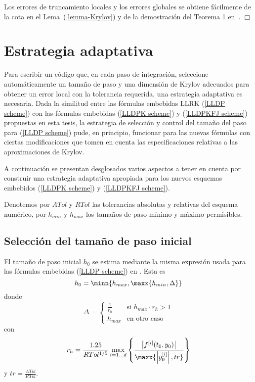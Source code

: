 Los errores de truncamiento locales y los errores globales se obtiene fácilmente de la
cota en el Lema~(\ref{lemma-Krylov}) y de la demostración del Teorema 1 en~\cite{Jimenez14AMC}. $\Box$

\section{Estrategia adaptativa\label{ADAPT-STR}}

Para escribir un c\'odigo que, en cada paso de integración, seleccione automáticamente un tama\~no de paso y una dimensi\'on de Krylov adecuados para obtener un error local con la tolerancia
requerida, una estrategia adaptativa es necesaria. 
Dada la similitud entre las fórmulas embebidas LLRK (\ref{LLDP scheme}) con las fórmulas embebidas (\ref{LLDPK scheme}) y (\ref{LLDPKFJ scheme}) propuestas en esta tesis, la estrategia de selección y control del tamaño del paso para (\ref{LLDP scheme}) pude, en principio, funcionar para las nuevas fórmulas con ciertas modificaciones que tomen en cuenta las especificaciones relativas a las aproximaciones de Krylov. 

A continuación se presentan desglosados varios aspectos a tener en cuenta por construir una estrategia adaptativa apropiada para los nuevos esquemas embebidos (\ref{LLDPK scheme}) y (\ref{LLDPKFJ scheme}).

Denotemos por $ATol$ y $RTol$ las tolerancias absolutas y relativas del esquema numérico, por $h_{min}$ y $h_{max}$ los tamaños de paso mínimo y máximo permisibles. 
  
\subsection{Selecci\'on del tama\~no de paso inicial}\label{inicio}
El tamaño de paso inicial $h_0$ se estima mediante la misma expresión usada para las fórmulas embebidas (\ref{LLDP scheme}) en \cite{Jimenez14AMC}. Esta es
\begin{equation}
h_0 = \minn{ h_{max}, \maxx{ h_{min} ,\Delta} } \label{hcero}
\end{equation}
donde
\[ \Delta = \begin{cases}
\frac{1}{r_h} & \text{si } h_{max}\cdot r_h>1\\
h_{max} & \text{en otro caso}
\end{cases} \]	
con
\[ r_h = \frac{1\mathord{.}25}{RTol^{1/5}}\max_{i=1\ldots d}\left\{\frac{ \left\lvert f^{[i]}(t_0,y_0) \right\rvert }
{\maxx{\left\lvert y^{[i]}_0 \right\rvert ,tr}}\right\} \]
y $tr = \frac{ATol}{RTol}$.

